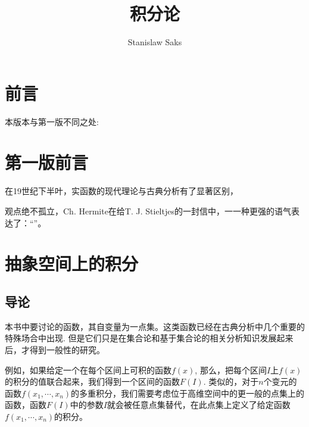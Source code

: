 \documentclass[12pt,a4paper]{book}
\title{积分论}
\author{Stanislaw Saks}
\begin{document}
\renewcommand{\contentsname}{目\quad{}录}
\renewcommand{\chaptername}{}

\renewcommand{\chaptername}{第~\thechapter~章}

\titleformat{\chapter}[hang]{\centering\LARGE\bfseries}{\chaptername}{1em}{}


\frontmatter
\begin{titlepage}
\maketitle
\end{titlepage}
\setcounter{page}{0}
\chapter{前言}
本版本与第一版不同之处:

\chapter{第一版前言}
在19世纪下半叶，实函数的现代理论与古典分析有了显著区别，

观点绝不孤立，Ch. Hermite在给T. J. Stieltjes的一封信中，一一种更强的语气表达了：“”。
 
\tableofcontents

\mainmatter
\chapter{抽象空间上的积分}
\section{导论}
本书中要讨论的函数，其自变量为一点集。这类函数已经在古典分析中几个重要的特殊场合中出现. 但是它们只是在集合论和基于集合论的相关分析知识发展起来后，才得到一般性的研究。

例如，如果给定一个在每个区间上可积的函数$f(x)$, 那么，把每个区间$I$上$f(x)$的积分的值联合起来，我们得到一个区间的函数$F(I)$. 类似的，对于$n$个变元的函数$f(x_1,\cdots, x_n)$的多重积分，我们需要考虑位于高维空间中的更一般的点集上的函数，函数$F(I)$中的参数$I$就会被任意点集替代，在此点集上定义了给定函数$f(x_1,\cdots, x_n)$的积分。
\end{document}
